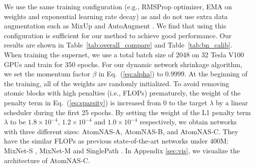 \documentclass{article} \usepackage{iclr2020_conference,times}
\newcommand{\flops}{FLOPs\xspace}
\begin{document}
We use the same training configuration (e.g., RMSProp optimizer, EMA on weights and exponential learning rate decay) as \cite{tan2019mnasnet,stamoulis2019single_path} and do not use extra data augmentation such as MixUp \citep{zhang2018mixup} and AutoAugment \citep{cubuk2018autoaugment}. We find that using this configuration is sufficient for our method to achieve good performance. Our results are shown in Table~\ref{tab:overall_compare} and Table~\ref{tab:bn_calib}. When training the supernet, we use a total batch size of 2048 on 32 Tesla V100 GPUs and train for 350 epochs. For our dynamic network shrinkage algorithm, we set the momentum factor $\beta$ in Eq.~(\ref{eq:alpha}) to $0.9999$. At the beginning of the training, all of the weights are randomly initialized. To avoid removing atomic blocks with high penalties (i.e., \flops) prematurely, the weight of the penalty term in Eq.~(\ref{eq:sparsity}) is increased from 0 to the target $\lambda$ by a linear scheduler during the first 25 epochs. By setting the weight of the L1 penalty term $\lambda$ to be $1.8 \times 10^{-4}$, $1.2\times 10^{-4}$ and $1.0 \times 10^{-4}$ respectively, we obtain networks with three different sizes: AtomNAS-A, AtomNAS-B, and AtomNAS-C. They have the similar \flops as previous state-of-the-art networks under $400$M: MixNet-S \citep{tan2019mixnet}, MixNet-M \citep{tan2019mixnet} and SinglePath \citep{stamoulis2019single_path}. In Appendix \ref{sec:vis}, we visualize the architecture of AtomNAS-C.
\end{document}
